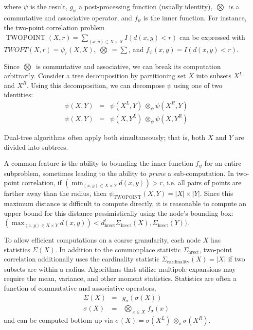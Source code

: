 \documentclass[times, 10pt,twocolumn]{article}
\DeclareMathOperator{\TWOPT}{TWOPOINT}
\newcommand{\kdleft}[1]{#1^{\!L}}
\newcommand{\kdright}[1]{#1^{\!R}}
\newcommand{\lo}[1]{#1^{\!l}}
\newcommand{\distlo}[1]{\lo{d_{\text{hrect}}}}
\newcommand{\myOp}[1]{\mathop{\bigotimes\nolimits\!\!_{#1}}}
\newcommand{\myop}[1]{{\scriptstyle\:}\otimes_{\!#1}}
\newcommand{\letterglob}{\psi}
\newcommand{\inglob}{\psi}
\newcommand{\Opglob}{\myOp{\letterglob}}
\newcommand{\opglob}{\myop{\letterglob}}
\newcommand{\fglob}{f_{\letterglob}}
\newcommand{\gglob}{g_{\letterglob}}
\newcommand{\namestat}[1]{\Sigma_{\text{#1}}}
\newcommand{\outstat}{\Sigma}
\newcommand{\instat}{\sigma}
\newcommand{\Opstat}{\myOp{\instat}}
\newcommand{\opstat}{\myop{\instat}}
\newcommand{\fstat}{f_{\instat}}
\newcommand{\gstat}{g_{\instat}}
\begin{document}
\noindent where $\inglob$ is the result, $\gglob$ a post-processing function (usually identity), $\Opglob$ is a commutative and associative operator, and $\fglob$ is the inner function.
For instance, the two-point correlation problem $\TWOPT(X, r) = \sum_{(x, y) \in X \times X} I(d(x, y) < r)$ can be expressed with $TWOPT(X, r) = \inglob_r(X, X)$, $\Opglob = \sum$, and $\fglob(x, y) = I(d(x, y) < r)$.

Since $\Opglob$ is commutative and associative, we can break its computation arbitrarily.
Consider a tree decomposition by partitioning set $X$ into subsets $\kdleft{X}$ and $\kdright{X}$.
Using this decomposition, we can decompose $\inglob$ using one of two identities:
\begin{eqnarray}
\inglob(X, Y) &=& \inglob(\kdleft{X}, Y) \opglob \inglob(\kdright{X}, Y)
\\
\inglob(X, Y) &=& \inglob(X, \kdleft{Y}) \opglob \inglob(X, \kdright{Y})
\label{eqn:divideglob}
\end{eqnarray}

\noindent Dual-tree algorithms often apply both simultaneously; that is, both $X$ and $Y$ are divided into subtrees.

A common feature is the ability to bounding the inner function $\fglob$ for an entire subproblem, sometimes leading to the ability to {\it prune} a sub-computation.
In two-point correlation, if $\left(\min_{(x, y) \in X \times Y} d(x, y)\right) > r$, i.e. all pairs of points are farther away than the radius, then $\inglob_{\TWOPT}(X, Y) = |X| \times |Y|$.
Since this maximum distance is difficult to compute directly, it is reasonable to compute an upper bound for this distance pessimistically using the node's bounding box: $\left(\max_{(x, y) \in X \times Y} d(x, y)\right) < \distlo(\namestat{hrect}(X), \namestat{hrect}(Y))$.

To allow efficient computations on a coarse granularity, each node $X$ has statistics $\outstat(X)$.
In addition to the commonplace statistic $\namestat{hrect}$, two-point correlation additionally uses the cardinality statistic $\namestat{cardinality}(X) = |X|$ if two subsets are within a radius.
Algorithms that utilize multipole expansions may require the mean, variance, and other moment statistics.
Statistics are often a function of commutative and associative operators,
\begin{eqnarray}
\outstat(X) &=& \gstat(\instat(X))
\\
\instat(X) &=& \Opstat_{x \in X} \fstat(x)
\label{eqn:defstat}
\end{eqnarray}
\noindent and can be computed bottom-up via $\instat(X) = \instat(\kdleft{X}) \opstat \instat(\kdright{X})$.
\end{document}
